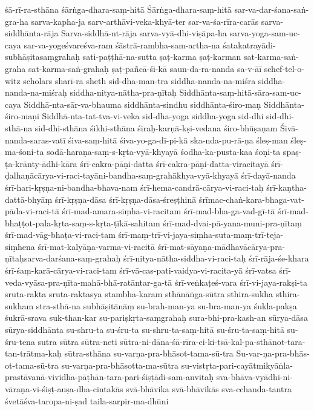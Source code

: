 {śā-rī-ra-sthāna
śārṅga-dhara-saṃ-hitā
Śārṅga-dhara-saṃ-hitā
sar-va-dar-śana-saṅ-gra-ha
sarva-kapha-ja
sarv-arthāvi-veka-khyā-ter
sar-va-śa-rīra-carās
sarva-siddhānta-rāja
Sarva-siddhā-nt-rāja
sarva-vyā-dhi-viṣāpa-ha
sarva-yoga-sam-uc-caya
sar-va-yogeśvareśva-ram
śāstrā-rambha-sam-artha-na
śatakatrayādi-subhāṣitasaṃgrahaḥ
sati-paṭṭhā-na-sutta
ṣaṭ-karma
ṣaṭ-karman
sat-karma-saṅ-graha
sat-karma-saṅ-grahaḥ
ṣaṭ-pañcā-śi-kā
saun-da-ra-nanda
sa-v-āī
schef-tel-o-witz
scholars
sharī-ra
sheth
sid-dha-man-tra
siddha-nanda-na-miśra
siddha-nanda-na-miśraḥ
siddha-nitya-nātha-pra-ṇītaḥ
Siddhānta-saṃ-hitā-sāra-sam-uc-caya
Siddhā-nta-sār-va-bhauma
siddhānta-sindhu
siddhānta-śiro-maṇ
Siddhānta-śiro-maṇi
Siddhā-nta-tat-tva-vi-veka
sid-dha-yoga
siddha-yoga
sid-dhi
sid-dhi-sthā-na
sid-dhi-sthāna
śikhi-sthāna
śiraḥ-karṇā-kṣi-vedana
śiro-bhūṣaṇam
Śivā-nanda-saras-vatī
śiva-saṃ-hitā
śiva-yo-ga-dī-pi-kā
ska-nda-pu-rā-ṇa
śleṣ-man
śleṣ-ma-śoni-ta
sodā-haraṇa-saṃ-s-kṛta-vyā-khyayā
śodha-ka-pusta-kaa
śoṇi-ta
spaṣ-ṭa-krānty-ādhi-kāra
śrī-cakra-pāṇi-datta
śrī-cakra-pāṇi-datta-viracitayā
śrī-ḍalhaṇācārya-vi-raci-tayāni-bandha-saṃ-grahākhya-vyā-khyayā
śrī-dayā-nanda
śrī-hari-kṛṣṇa-ni-bandha-bhava-nam
śrī-hema-candrā-cārya-vi-raci-taḥ
śrī-kaṇtha-dattā-bhyāṃ
śrī-kṛṣṇa-dāsa
śrī-kṛṣṇa-dāsa-śreṣṭhinā
śrīmac-chaṅ-kara-bhaga-vat-pāda-vi-raci-tā
śrī-mad-amara-siṃha-vi-racitam
śrī-mad-bha-ga-vad-gī-tā
śrī-mad-bhaṭṭot-pala-kṛta-saṃ-s-kṛta-ṭīkā-sahitam
śrī-mad-dvai-pā-yana-muni-pra-ṇītaṃ
śrī-mad-vāg-bhaṭa-vi-raci-tam
śrī-maṃ-trī-vi-jaya-siṃha-suta-maṃ-trī-teja-siṃhena
śrī-mat-kalyāṇa-varma-vi-racitā
śrī-mat-sāyaṇa-mādhavācārya-pra-ṇītaḥsarva-darśana-saṃ-grahaḥ
śrī-nitya-nātha-siddha-vi-raci-taḥ
śrī-rāja-śe-khara
śrī-śaṃ-karā-cārya-vi-raci-tam
śrī-vā-cas-pati-vaidya-vi-racita-yā
śrī-vatsa
śrī-veda-vyāsa-pra-ṇīta-mahā-bhā-ratāntar-ga-tā
śrī-veṅkaṭeś-vara
śrī-vi-jaya-rakṣi-ta
sruta-rakta
sruta-raktasya
stambha-karam
sthānāṅga-sūtra
sthira-sukha
sthira-sukham
stra-sthā-na
subhāṣitānāṃ
su-brah-man-ya
su-bra-man-ya
śukla-pakṣa
śukrā-srava
suk-than-kar
su-pariṣkṛta-saṃgrahaḥ
sura-bhi-pra-kash-an
sūrya-dāsa
sūrya-siddhānta
su-shru-ta
su-śru-ta
su-shru-ta-saṃ-hitā
su-śru-ta-saṃ-hitā
su-śru-tena
sutra
sūtra
sūtra-neti
sūtra-ni-dāna-śā-rīra-ci-ki-tsā-kal-pa-sthānot-tara-tan-trātma-kaḥ
sūtra-sthāna
su-varṇa-pra-bhāsot-tama-sū-tra
Su-var-ṇa-pra-bhās-ot-tama-sū-tra
su-varṇa-pra-bhāsotta-ma-sūtra
su-vistṛta-pari-cayātmikyāṅla-prastāvanā-vividha-pāṭhān-tara-pari-śiṣṭādi-sam-anvitaḥ
sva-bhāva-vyādhi-ni-vāraṇa-vi-śiṣṭ-auṣa-dha-cintakās
svā-bhāvika
svā-bhāvikās
sva-cchanda-tantra
śvetāśva-taropa-ni-ṣad
taila-sarpir-ma-dhūni
}
